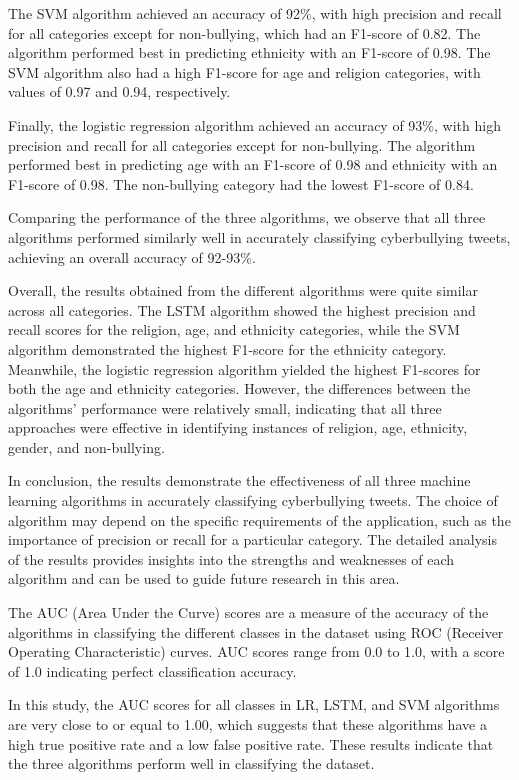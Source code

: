 \documentclass[conference]{IEEEtran}
\begin{document}
The SVM algorithm achieved an accuracy of 92\%, with high precision and recall for all categories except for non-bullying, which had an F1-score of 0.82. The algorithm performed best in predicting ethnicity with an F1-score of 0.98. The SVM algorithm also had a high F1-score for age and religion categories, with values of 0.97 and 0.94, respectively.


Finally, the logistic regression algorithm achieved an accuracy of 93\%, with high precision and recall for all categories except for non-bullying. The algorithm performed best in predicting age with an F1-score of 0.98 and ethnicity with an F1-score of 0.98. The non-bullying category had the lowest F1-score of 0.84.


Comparing the performance of the three algorithms, we observe that all three algorithms performed similarly well in accurately classifying cyberbullying tweets, achieving an overall accuracy of 92-93\%.

Overall, the results obtained from the different algorithms were quite similar across all categories. The LSTM algorithm showed the highest precision and recall scores for the religion, age, and ethnicity categories, while the SVM algorithm demonstrated the highest F1-score for the ethnicity category. Meanwhile, the logistic regression algorithm yielded the highest F1-scores for both the age and ethnicity categories. However, the differences between the algorithms' performance were relatively small, indicating that all three approaches were effective in identifying instances of religion, age, ethnicity, gender, and non-bullying.

In conclusion, the results demonstrate the effectiveness of all three machine learning algorithms in accurately classifying cyberbullying tweets. The choice of algorithm may depend on the specific requirements of the application, such as the importance of precision or recall for a particular category. The detailed analysis of the results provides insights into the strengths and weaknesses of each algorithm and can be used to guide future research in this area.

The AUC (Area Under the Curve) scores are a measure of the accuracy of the algorithms in classifying the different classes in the dataset using ROC (Receiver Operating Characteristic) curves. AUC scores range from 0.0 to 1.0, with a score of 1.0 indicating perfect classification accuracy.

In this study, the AUC scores for all classes in LR, LSTM, and SVM algorithms are very close to or equal to 1.00, which suggests that these algorithms have a high true positive rate and a low false positive rate. These results indicate that the three algorithms perform well in classifying the dataset.
\end{document}
